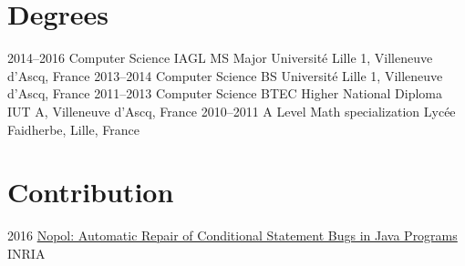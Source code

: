 \documentclass[hidelinks]{cv-style}          %
\begin{document}
\section{Degrees}
\begin{entrylist}

\entry
{2014--2016}
{Computer Science IAGL MS {\normalfont Major}}
{Université Lille 1, Villeneuve d'Ascq, France}
{\vspace{-0.3cm}}
\entry
{2013--2014}
{Computer Science BS}
{Université Lille 1, Villeneuve d'Ascq, France}
{\vspace{-0.3cm}}
\entry
{2011--2013}
{Computer Science BTEC Higher National Diploma}
{IUT A, Villeneuve d'Ascq, France}
{\vspace{-0.3cm}}
\entry
{2010--2011}
{A Level {\normalfont Math specialization}}
{Lycée Faidherbe, Lille, France}
{\vspace{-0.3cm}}

\end{entrylist}
\leavevmode\newline



\section{Contribution}
\begin{entrylist}

\entry
{2016}
{\href{https://hal.archives-ouvertes.fr/hal-01285008}{Nopol: Automatic Repair of Conditional Statement Bugs in Java Programs}}
{INRIA}
{\vspace{-0.3cm}}

\end{entrylist}
\leavevmode\newline


\end{document}
